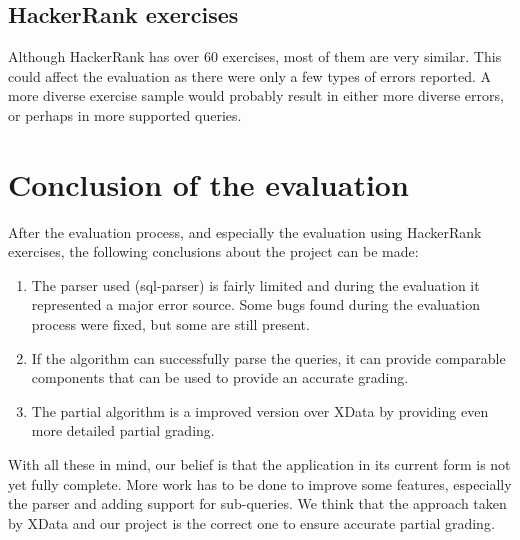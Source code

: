 \subsection{HackerRank exercises}
Although HackerRank has over 60 exercises, most of them are very similar. This could affect the evaluation as there were only a few types of errors reported. A more diverse exercise sample would probably result in either more diverse errors, or perhaps in more supported queries.

\section{Conclusion of the evaluation}
After the evaluation process, and especially the evaluation using HackerRank exercises, the following conclusions about the project can be made:
\begin{enumerate}
    \item The parser used (sql-parser) is fairly limited and during the evaluation it represented a major error source. Some bugs found during the evaluation process were fixed, but some are still present.
    \item If the algorithm can successfully parse the queries, it can provide comparable components that can be used to provide an accurate grading.
    \item The partial algorithm is a improved version over XData by providing even more detailed partial grading.
\end{enumerate}

With all these in mind, our belief is that the application in its current form is not yet fully complete. More work has to be done to improve some features, especially the parser and adding support for sub-queries. We think that the approach taken by XData and our project is the correct one to ensure accurate partial grading.